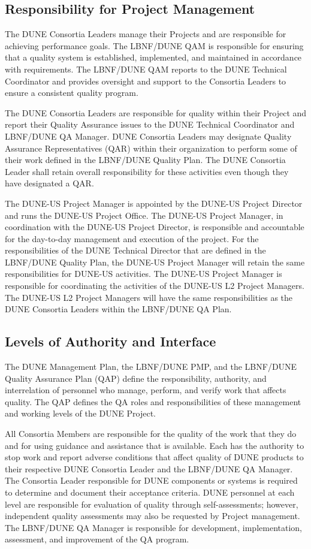 \subsection{Responsibility for Project Management}

The DUNE Consortia Leaders manage their Projects and are responsible
for achieving performance goals. The LBNF/DUNE QAM is responsible for
ensuring that a quality system is established, implemented, and
maintained in accordance with requirements. The LBNF/DUNE QAM reports
to the DUNE Technical Coordinator and provides oversight and support
to the Consortia Leaders to ensure a consistent quality program.

The DUNE Consortia Leaders are responsible for quality within their
Project and report their Quality Assurance issues to the DUNE
Technical Coordinator and LBNF/DUNE QA Manager. DUNE Consortia Leaders
may designate Quality Assurance Representatives (QAR) within their
organization to perform some of their work defined in the LBNF/DUNE
Quality Plan. The DUNE Consortia Leader shall retain overall
responsibility for these activities even though they have designated a
QAR.

The DUNE-US Project Manager is appointed by the DUNE-US Project
Director and runs the DUNE-US Project Office. The DUNE-US Project
Manager, in coordination with the DUNE-US Project Director, is
responsible and accountable for the day-to-day management and
execution of the project. For the responsibilities of the DUNE
Technical Director that are defined in the LBNF/DUNE Quality Plan, the
DUNE-US Project Manager will retain the same responsibilities for
DUNE-US activities. The DUNE-US Project Manager is responsible for
coordinating the activities of the DUNE-US L2 Project Managers. The
DUNE-US L2 Project Managers will have the same responsibilities as the
DUNE Consortia Leaders within the LBNF/DUNE QA Plan.

\subsection{Levels of Authority and Interface}

The DUNE Management Plan, the LBNF/DUNE PMP, and the LBNF/DUNE Quality
Assurance Plan (QAP) define the responsibility, authority, and
interrelation of personnel who manage, perform, and verify work that
affects quality. The QAP defines the QA roles and responsibilities of
these management and working levels of the DUNE Project.

All Consortia Members are responsible for the quality of the work that
they do and for using guidance and assistance that is available. Each
has the authority to stop work and report adverse conditions that
affect quality of DUNE products to their respective DUNE Consortia
Leader and the LBNF/DUNE QA Manager. The Consortia Leader responsible
for DUNE components or systems is required to determine and document
their acceptance criteria. DUNE personnel at each level are
responsible for evaluation of quality through self-assessments;
however, independent quality assessments may also be requested by
Project management.  The LBNF/DUNE QA Manager is responsible for
development, implementation, assessment, and improvement of the QA
program.

